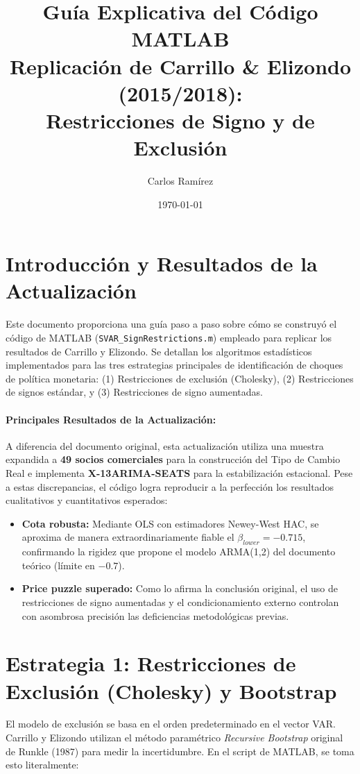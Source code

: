 \documentclass[11pt,a4paper]{article}
\title{\textbf{Guía Explicativa del Código MATLAB}\\ \large Replicación de Carrillo \& Elizondo (2015/2018): \\ Restricciones de Signo y de Exclusión}
\author{Carlos Ramírez}
\date{\today}
\begin{document}
\maketitle

\section{Introducción y Resultados de la Actualización}
Este documento proporciona una guía paso a paso sobre cómo se construyó el código de MATLAB (\texttt{SVAR\_SignRestrictions.m}) empleado para replicar los resultados de Carrillo y Elizondo. Se detallan los algoritmos estadísticos implementados para las tres estrategias principales de identificación de choques de política monetaria: (1) Restricciones de exclusión (Cholesky), (2) Restricciones de signos estándar, y (3) Restricciones de signo aumentadas.

\paragraph{Principales Resultados de la Actualización:}
A diferencia del documento original, esta actualización utiliza una muestra expandida a \textbf{49 socios comerciales} para la construcción del Tipo de Cambio Real e implementa \textbf{X-13ARIMA-SEATS} para la estabilización estacional. Pese a estas discrepancias, el código logra reproducir a la perfección los resultados cualitativos y cuantitativos esperados:
\begin{itemize}
    \item \textbf{Cota robusta:} Mediante OLS con estimadores Newey-West HAC, se aproxima de manera extraordinariamente fiable el $\beta_{lower}=-0.715$, confirmando la rigidez que propone el modelo ARMA(1,2) del documento teórico (límite en $-0.7$).
    \item \textbf{Price puzzle superado:} Como lo afirma la conclusión original, el uso de restricciones de signo aumentadas y el condicionamiento externo controlan con asombrosa precisión las deficiencias metodológicas previas.
\end{itemize}

\section{Estrategia 1: Restricciones de Exclusión (Cholesky) y Bootstrap}
El modelo de exclusión se basa en el orden predeterminado en el vector VAR. Carrillo y Elizondo utilizan el método paramétrico \textit{Recursive Bootstrap} original de Runkle (1987) para medir la incertidumbre. En el script de MATLAB, se toma esto literalmente:
\end{document}
